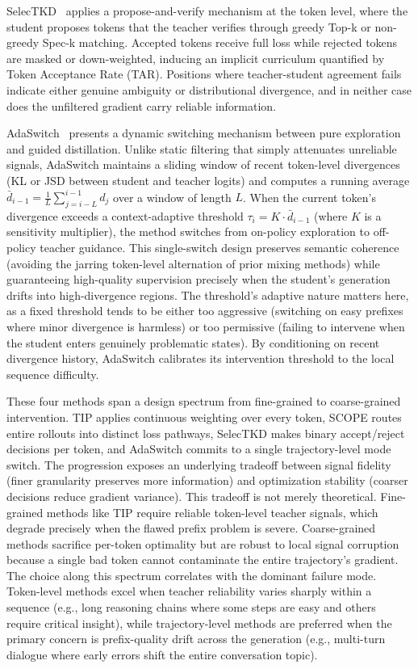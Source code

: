 \documentclass{article} %
\begin{document}
SelecTKD~\citep{2510.24021} applies a propose-and-verify mechanism at the token level, where the student proposes tokens that the teacher verifies through greedy Top-k or non-greedy Spec-k matching. Accepted tokens receive full loss while rejected tokens are masked or down-weighted, inducing an implicit curriculum quantified by Token Acceptance Rate (TAR). Positions where teacher-student agreement fails indicate either genuine ambiguity or distributional divergence, and in neither case does the unfiltered gradient carry reliable information.

AdaSwitch~\citep{2510.07842} presents a dynamic switching mechanism between pure exploration and guided distillation. Unlike static filtering that simply attenuates unreliable signals, AdaSwitch maintains a sliding window of recent token-level divergences (KL or JSD between student and teacher logits) and computes a running average $\bar{d}_{i-1} = \frac{1}{L}\sum_{j=i-L}^{i-1} d_j$ over a window of length $L$. When the current token's divergence exceeds a context-adaptive threshold $\tau_i = K \cdot \bar{d}_{i-1}$ (where $K$ is a sensitivity multiplier), the method switches from on-policy exploration to off-policy teacher guidance. This single-switch design preserves semantic coherence (avoiding the jarring token-level alternation of prior mixing methods) while guaranteeing high-quality supervision precisely when the student's generation drifts into high-divergence regions. The threshold's adaptive nature matters here, as a fixed threshold tends to be either too aggressive (switching on easy prefixes where minor divergence is harmless) or too permissive (failing to intervene when the student enters genuinely problematic states). By conditioning on recent divergence history, AdaSwitch calibrates its intervention threshold to the local sequence difficulty.

These four methods span a design spectrum from fine-grained to coarse-grained intervention. TIP applies continuous weighting over every token, SCOPE routes entire rollouts into distinct loss pathways, SelecTKD makes binary accept/reject decisions per token, and AdaSwitch commits to a single trajectory-level mode switch. The progression exposes an underlying tradeoff between signal fidelity (finer granularity preserves more information) and optimization stability (coarser decisions reduce gradient variance). This tradeoff is not merely theoretical. Fine-grained methods like TIP require reliable token-level teacher signals, which degrade precisely when the flawed prefix problem is severe. Coarse-grained methods sacrifice per-token optimality but are robust to local signal corruption because a single bad token cannot contaminate the entire trajectory's gradient. The choice along this spectrum correlates with the dominant failure mode. Token-level methods excel when teacher reliability varies sharply within a sequence (e.g., long reasoning chains where some steps are easy and others require critical insight), while trajectory-level methods are preferred when the primary concern is prefix-quality drift across the generation (e.g., multi-turn dialogue where early errors shift the entire conversation topic).
\end{document}
